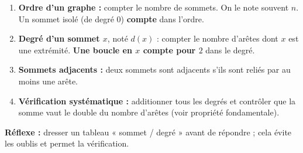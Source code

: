 \documentclass[11pt]{article}
\newcommand{\cle}[1]{{\popxbold\color{popdark}#1}}
\begin{document}
\begin{methode}
\begin{enumerate}
\item \textbf{Ordre d'un graphe :} compter le nombre de \cle{sommets}. On le note souvent $n$. Un sommet \cle{isolé} (de degré $0$) \textbf{compte} dans l'ordre.
\item \textbf{Degré d'un sommet $x$}, noté $d(x)$ : compter le nombre d'arêtes dont $x$ est une extrémité. \textbf{Une boucle en $x$ compte pour $2$} dans le degré.
\item \textbf{Sommets adjacents :} deux sommets sont \cle{adjacents} s'ils sont reliés par au moins une arête.
\item \textbf{Vérification systématique :} additionner tous les degrés et contrôler que la somme vaut le double du nombre d'arêtes (voir propriété fondamentale).
\end{enumerate}
\textbf{Réflexe :} dresser un tableau « sommet / degré » avant de répondre ; cela évite les oublis et permet la vérification.
\end{methode}
\end{document}
